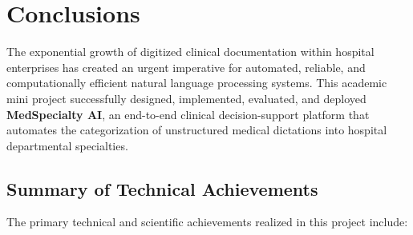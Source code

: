 \clearpage

\section{Conclusions}

The exponential growth of digitized clinical documentation within hospital enterprises has created an urgent imperative for automated, reliable, and computationally efficient natural language processing systems. This academic mini project successfully designed, implemented, evaluated, and deployed \textbf{MedSpecialty AI}, an end-to-end clinical decision-support platform that automates the categorization of unstructured medical dictations into hospital departmental specialties.

\subsection{Summary of Technical Achievements}

The primary technical and scientific achievements realized in this project include:

